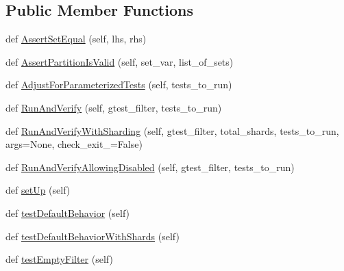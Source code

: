 \subsection*{Public Member Functions}
\begin{DoxyCompactItemize}
\item 
def \mbox{\hyperlink{classgoogletest_1_1test_1_1googletest-filter-unittest_1_1_g_test_filter_unit_test_adfce1a19bbb59d11eba147f85b0a4f12}{Assert\+Set\+Equal}} (self, lhs, rhs)
\item 
def \mbox{\hyperlink{classgoogletest_1_1test_1_1googletest-filter-unittest_1_1_g_test_filter_unit_test_acdba5313b3805759277a86c752f08985}{Assert\+Partition\+Is\+Valid}} (self, set\+\_\+var, list\+\_\+of\+\_\+sets)
\item 
def \mbox{\hyperlink{classgoogletest_1_1test_1_1googletest-filter-unittest_1_1_g_test_filter_unit_test_a2ab2fdfe1a6e2e90865a47ec8504af62}{Adjust\+For\+Parameterized\+Tests}} (self, tests\+\_\+to\+\_\+run)
\item 
def \mbox{\hyperlink{classgoogletest_1_1test_1_1googletest-filter-unittest_1_1_g_test_filter_unit_test_a933231d85dd2ca071b01d690abc3457f}{Run\+And\+Verify}} (self, gtest\+\_\+filter, tests\+\_\+to\+\_\+run)
\item 
def \mbox{\hyperlink{classgoogletest_1_1test_1_1googletest-filter-unittest_1_1_g_test_filter_unit_test_ac7d46fecfa3b0e865df66dc460805ff4}{Run\+And\+Verify\+With\+Sharding}} (self, gtest\+\_\+filter, total\+\_\+shards, tests\+\_\+to\+\_\+run, args=None, check\+\_\+exit\+\_=False)
\item 
def \mbox{\hyperlink{classgoogletest_1_1test_1_1googletest-filter-unittest_1_1_g_test_filter_unit_test_afefe222e441a72419e9f8a553eeb8150}{Run\+And\+Verify\+Allowing\+Disabled}} (self, gtest\+\_\+filter, tests\+\_\+to\+\_\+run)
\item 
def \mbox{\hyperlink{classgoogletest_1_1test_1_1googletest-filter-unittest_1_1_g_test_filter_unit_test_a8c0de5b9e682a3d985190bf6ccbb7bca}{set\+Up}} (self)
\item 
def \mbox{\hyperlink{classgoogletest_1_1test_1_1googletest-filter-unittest_1_1_g_test_filter_unit_test_a170a456f42cd224601357b20d2e08c5a}{test\+Default\+Behavior}} (self)
\item 
def \mbox{\hyperlink{classgoogletest_1_1test_1_1googletest-filter-unittest_1_1_g_test_filter_unit_test_a6b09dce75da9542b3be1556a64398a5d}{test\+Default\+Behavior\+With\+Shards}} (self)
\item 
def \mbox{\hyperlink{classgoogletest_1_1test_1_1googletest-filter-unittest_1_1_g_test_filter_unit_test_aa7b4cc636cfaf1c098b011fb8a7a5cc6}{test\+Empty\+Filter}} (self)

\end{DoxyCompactItemize}
